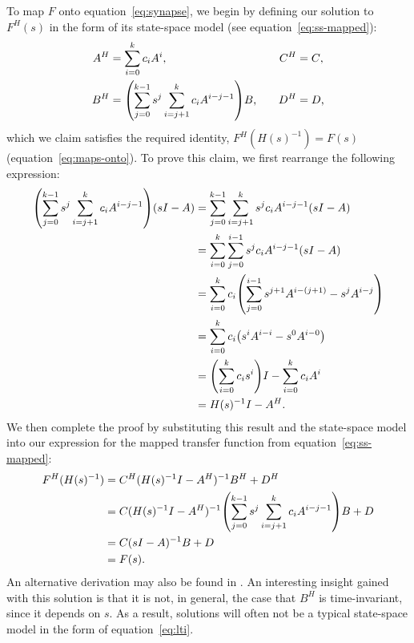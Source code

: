 \documentclass[12pt]{article}
\theoremstyle{definition}
\let\originalleft\left
\let\originalright\right
\renewcommand{\left}{\mathopen{}\mathclose\bgroup\originalleft}
\renewcommand{\right}{\aftergroup\egroup\originalright}
\begin{document}
To map $F$ onto equation~\ref{eq:synapse}, we begin by defining our solution to $F^{H}(s)$ in the form of its state-space model (see equation~\ref{eq:ss-mapped}):
\begin{equation} \label{eq:general-linear}
\begin{aligned}
A^H &= \sum_{i=0}^k c_i A^i \text{,} & \quad C^H &= C \text{,} \\
B^H &= \left( \sum_{j=0}^{k-1} s^j \sum_{i=j+1}^k c_i A^{i-j-1} \right) B \text{,} & \quad D^H &= D \text{,}
\end{aligned}
\end{equation}
which we claim satisfies the required identity, $F^{H}(H(s)^{-1}) = F(s)$ (equation~\ref{eq:maps-onto}).
To prove this claim, we first rearrange the following expression:
\begin{align*}
\left( \sum_{j=0}^{k-1} s^j \sum_{i=j+1}^k c_i A^{i-j-1} \right) (sI - A)  &= \sum_{j=0}^{k-1} \sum_{i=j+1}^k s^j c_i A^{i-j-1} (sI - A) \\
&= \sum_{i=0}^{k} \sum_{j=0}^{i-1} s^j c_i A^{i-j-1} (sI - A)  \\
&= \sum_{i=0}^k c_i \left( \sum_{j=0}^{i-1} s^{j+1} A^{i - (j + 1)} - s^j A^{i - j} \right) \\
&= \sum_{i=0}^k c_i \left( s^i A^{i - i} - s^0 A^{i-0} \right) \\
&= \left( \sum_{i=0}^k c_i s^i \right) I - \sum_{i=0}^k c_i A^i \\
&= H(s)^{-1}I - A^H \text{.}
\end{align*}
We then complete the proof by substituting this result and the state-space model into our expression for the mapped transfer function from equation~\ref{eq:ss-mapped}:
\begin{align*}
F^H(H(s)^{-1}) &= C^H(H(s)^{-1}I - A^H)^{-1} B^H + D^H \\
&= C(H(s)^{-1}I - A^H)^{-1} \left( \sum_{j=0}^{k-1} s^j \sum_{i=j+1}^k c_i A^{i-j-1} \right) B + D \\
&= C(sI - A)^{-1} B + D \\
&= F(s) \text{.}
\end{align*}
An alternative derivation may also be found in \citet[][section~2.2]{voelker2017neuromorphic}.
An interesting insight gained with this solution is that it is not, in general, the case that $B^H$ is time-invariant, since it depends on $s$.
As a result, solutions will often not be a typical state-space model in the form of equation~\ref{eq:lti}.
\end{document}
